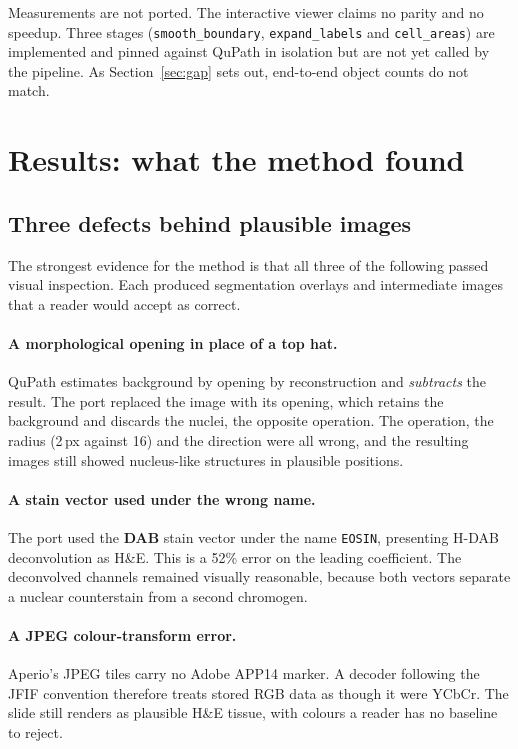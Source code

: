 \documentclass[11pt,a4paper]{article}
\begin{document}
Measurements are not ported. The interactive viewer claims no parity and no
speedup. Three stages (\texttt{smooth\_boundary}, \texttt{expand\_labels} and
\texttt{cell\_areas}) are implemented and pinned against QuPath in isolation
but are not yet called by the pipeline. As Section~\ref{sec:gap} sets out,
end-to-end object counts do not match.

\section{Results: what the method found}
\label{sec:results}

\subsection{Three defects behind plausible images}
\label{sec:bugs}

The strongest evidence for the method is that all three of the following passed
visual inspection. Each produced segmentation overlays and intermediate images
that a reader would accept as correct.

\paragraph{A morphological opening in place of a top hat.} QuPath estimates
background by opening by reconstruction and \emph{subtracts} the result. The
port replaced the image with its opening, which retains the background and
discards the nuclei, the opposite operation. The operation, the radius (2\,px
against 16) and the direction were all wrong, and the resulting images still
showed nucleus-like structures in plausible positions.

\paragraph{A stain vector used under the wrong name.} The port used the
\textbf{DAB} stain vector under the name \texttt{EOSIN}, presenting H-DAB
deconvolution as H\&E. This is a 52\% error on the leading coefficient. The
deconvolved channels remained visually reasonable, because both vectors
separate a nuclear counterstain from a second chromogen.

\paragraph{A JPEG colour-transform error.} Aperio's JPEG tiles carry no Adobe
APP14 marker. A decoder following the JFIF convention therefore treats stored
RGB data as though it were YCbCr. The slide still renders as plausible H\&E
tissue, with colours a reader has no baseline to reject.
\end{document}
